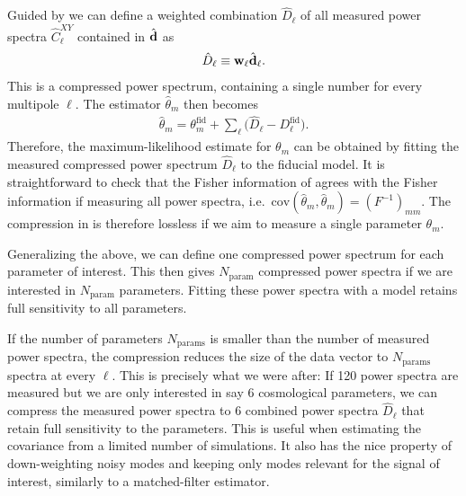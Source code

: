 \documentclass[prd,superscriptaddress,floatfix,notitlepage,nofootinbib,reprint]{revtex4-1} %
\begin{document}
Guided by  we can define a weighted combination $\hat D_\ell$ of all measured power spectra $\hat C^{XY}_\ell$ contained in $\hat{\textbf{d}}$ as
\begin{align}
  \label{eq:Dcompression}
  \hat{D}_\ell \equiv \mathbf{w}_\ell\hat{\textbf{d}}_\ell.
\end{align}
This is a compressed power spectrum, containing a single number for
every multipole $\ell$.
The estimator $\hat\theta_m$ then becomes
\begin{align}
  \label{eq:thetaEstiWithDl}
\hat\theta_m = \theta_m^\mathrm{fid} + \sum_\ell\big(\hat D_\ell - D_\ell^\mathrm{fid}\big).
\end{align}
Therefore, the maximum-likelihood estimate for $\theta_m$ can be obtained by fitting the measured compressed power spectrum $\hat D_\ell$ to the fiducial model.
It is straightforward to check that the Fisher information of  agrees with the Fisher information  if measuring all power spectra, i.e.~$\mathrm{cov}(\hat\theta_m,\hat\theta_m)=(F^{-1})_{mm}$.
The compression in  is therefore lossless if we aim to measure a single parameter $\theta_m$.

Generalizing the above, we can define one compressed power spectrum for each parameter of interest. 
This then gives $N_\mathrm{param}$ compressed power spectra if we are interested in $N_\mathrm{param}$ parameters.
Fitting these power spectra with a model retains full sensitivity to all parameters.

If the number of parameters $N_\mathrm{params}$ is smaller than the number of measured power spectra, the compression  reduces the size of the data vector to $N_\mathrm{params}$ spectra at every $\ell$.
This is precisely what we were after: If 120 power spectra are measured but we are only interested in say 6 cosmological parameters, we can compress the measured power spectra to 6 combined power spectra $\hat D_\ell$ that retain full sensitivity to the parameters.
This is useful when estimating the covariance from a limited number of simulations.
It also has the nice property of down-weighting noisy modes and keeping only modes relevant for the signal of interest, similarly to a matched-filter estimator.
\end{document}
